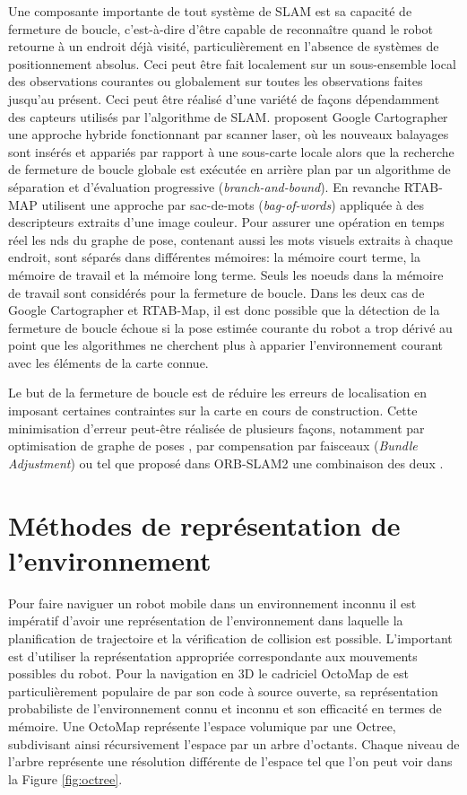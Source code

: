 Une composante importante de tout système de SLAM est sa capacité de fermeture de boucle, c'est-à-dire d'être capable de reconnaître quand le robot retourne à un endroit déjà visité, particulièrement en l'absence de systèmes de positionnement absolus. Ceci peut être fait localement sur un sous-ensemble local des observations courantes ou globalement sur toutes les observations faites jusqu'au présent. Ceci peut être réalisé d'une variété de façons dépendamment des capteurs utilisés par l'algorithme de SLAM. \citep{Hess2016} proposent Google Cartographer une approche hybride fonctionnant par scanner laser, où les nouveaux balayages sont insérés et appariés par rapport à une sous-carte locale alors que la recherche de fermeture de boucle globale est exécutée en arrière plan par un algorithme de séparation et d'évaluation progressive (\textit{branch-and-bound}). En revanche RTAB-MAP \citep{Labbe2014} utilisent une approche par sac-de-mots (\textit{bag-of-words}) appliquée à des descripteurs extraits d'une image couleur. Pour assurer une opération en temps réel les n\oeu ds du graphe de pose, contenant aussi les mots visuels extraits à chaque endroit, sont séparés dans différentes mémoires: la mémoire court terme, la mémoire de travail et la mémoire long terme. Seuls les noeuds dans la mémoire de travail sont considérés pour la fermeture de boucle. Dans les deux cas de Google Cartographer et RTAB-Map, il est donc possible que la détection de la fermeture de boucle échoue si la pose estimée courante du robot a trop dérivé au point que les algorithmes ne cherchent plus à apparier l'environnement courant avec les éléments de la carte connue.

Le but de la fermeture de boucle est de réduire les erreurs de localisation en imposant certaines contraintes sur la carte en cours de construction. Cette minimisation d'erreur peut-être réalisée de plusieurs façons, notamment par optimisation de graphe de poses \citep{Carlone2016}, par compensation par faisceaux (\textit{Bundle Adjustment}) \citep{Mei2011} ou tel que proposé dans ORB-SLAM2 une combinaison des deux \citep{Mur-Artal2017}.

\section{Méthodes de représentation de l'environnement}\label{subsec:representations}

Pour faire naviguer un robot mobile dans un environnement inconnu il est impératif d'avoir une représentation de l'environnement dans laquelle la planification de trajectoire et la vérification de collision est possible. L'important est d'utiliser la représentation appropriée correspondante aux mouvements possibles du robot. Pour la navigation en 3D le cadriciel OctoMap de \cite{Hornung2013} est particulièrement populaire de par son code à source ouverte, sa représentation probabiliste de l'environnement connu et inconnu et son efficacité en termes de mémoire. Une OctoMap représente l'espace volumique par une Octree, subdivisant ainsi récursivement l'espace par un arbre d'octants. Chaque niveau de l'arbre représente une résolution différente de l'espace tel que l'on peut voir dans la Figure \ref{fig:octree}.

